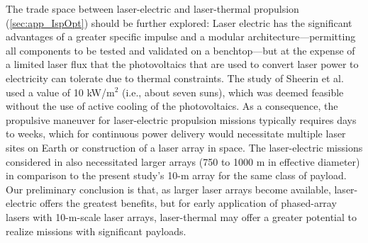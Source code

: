 \documentclass[final,3p,times,twocolumn,sort&compress, lefttitle]{elsarticle}
\begin{document}
        The trade space between laser-electric and laser-thermal propulsion (\ref{sec:app_IspOpt}) should be further explored: Laser electric has the significant advantages of a greater specific impulse and a modular architecture—permitting all components to be tested and validated on a benchtop—but at the expense of a limited laser flux that the photovoltaics that are used to convert laser power to electricity can tolerate due to thermal constraints. The study of Sheerin et al. used a value of 10 kW/m$^2$ (i.e., about seven suns), which was deemed feasible without the use of active cooling of the photovoltaics. As a consequence, the propulsive maneuver for laser-electric propulsion missions typically requires days to weeks, which for continuous power delivery would necessitate multiple laser sites on Earth or construction of a laser array in space. The laser-electric missions considered in \cite{sheerin_fast_2021} also necessitated larger arrays (750 to 1000 m in effective diameter) in comparison to the present study’s 10-m array for the same class of payload. Our preliminary conclusion is that, as larger laser arrays become available, laser-electric offers the greatest benefits, but for early application of phased-array lasers with 10-m-scale laser arrays, laser-thermal may offer a greater potential to realize missions with significant payloads.
        
\end{document}
